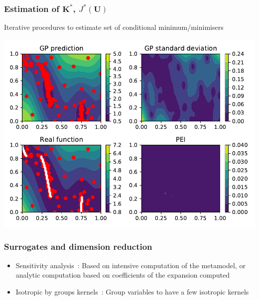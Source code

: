 \documentclass[11pt]{beamer}
\begin{document}
\begin{frame}
  \frametitle{Estimation of $\bm{K}^*$, $J^*(\bm{U})$}

  Iterative procedures to estimate set of conditional minimum/minimisers~\cite{ginsbourger_bayesian_2014}
  \begin{center}
  \includegraphics[scale=0.5]{PEI_branin}
\end{center}

\end{frame}

\begin{frame}
  \frametitle{Surrogates and dimension reduction}
  \begin{itemize}
  \item Sensitivity analysis~\cite{sudret_global_2008,le_gratiet_metamodel-based_2016}:
    Based on intensive computation of the metamodel, or analytic computation based on coefficients of the expansion computed
  \item Isotropic by groups kernels~\cite{blanchet-scalliet_specific_2017,ribaud_krigeage_2018-1}:
    Group variables to have a few isotropic kernels
  \end{itemize}

\end{frame}

\end{document}
